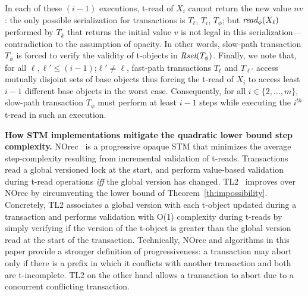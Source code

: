 \begin{proofsketch}
In each of these $(i-1)$ executions, t-read of $X_i$ cannot return the new value $nv$:
the only possible serialization for transactions is $T_{\ell}$, $T_i$, $T_{\phi}$; but $\textit{read}_{\phi}(X_{\ell})$
performed by $T_k$ that returns the initial value $v$ is not legal in this serialization---contradiction to the assumption of opacity.
In other words, slow-path transaction $T_{\phi}$ is forced to verify the validity of t-objects in $\textit{Rset}(T_{\phi})$.
Finally, we note that, for all $\ell, \ell' \leq (i-1)$;$\ell' \neq \ell$, 
fast-path transactions $T_{\ell}$ and $T_{\ell'}$ access mutually disjoint sets of base objects thus forcing the t-read of $X_i$ to access least $i-1$ different base objects
in the worst case.
Consequently, for all $i \in \{2,\ldots, m\}$, slow-path transaction $T_{\phi}$ must perform at least $i-1$ steps 
while executing the $i^{th}$ t-read in such an execution.
\end{proofsketch}
%
%
\vspace{1mm}\noindent\textbf{How STM implementations mitigate the quadratic lower bound step complexity.}
NOrec~\cite{norec} is a progressive opaque STM that minimizes the average step-complexity resulting from incremental 
validation of t-reads. Transactions read a global versioned lock at the start, and perform value-based validation
during t-read operations \emph{iff} the global version has changed.
TL2~\cite{DSS06} improves over NOrec by circumventing the lower bound
of Theorem~\ref{th:impossibility}. Concretely, TL2 associates a global version with each t-object updated during
a transaction and performs validation with O(1) complexity during t-reads by simply verifying if the version
of the t-object is greater than the global version read at the start of the transaction. Technically,
NOrec and algorithms in this paper provide a stronger definition of progressiveness: a transaction may abort
only if there is a prefix in which it conflicts with another transaction and both are t-incomplete. TL2 on the other hand allows
a transaction to abort due to a concurrent conflicting transaction.


